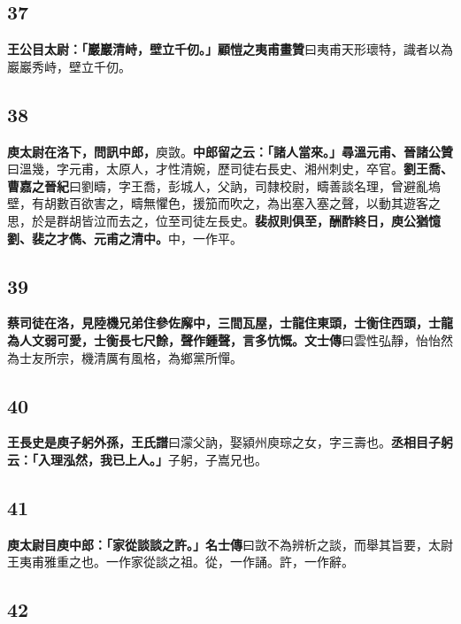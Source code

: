 \subsection*{37}

\textbf{王公目太尉：「巖巖清峙，壁立千仞。」}{\footnotesize \textbf{顧愷之夷甫畫贊}曰夷甫天形瓌特，識者以為巖巖秀峙，壁立千仞。}

\subsection*{38}

\textbf{庾太尉在洛下，問訊中郎，}{\footnotesize 庾敳。}\textbf{中郎留之云：「諸人當來。」尋溫元甫、}{\footnotesize \textbf{晉諸公贊}曰溫幾，字元甫，太原人，才性清婉，歷司徒右長史、湘州刺史，卒官。}\textbf{劉王喬、}{\footnotesize \textbf{曹嘉之晉紀}曰劉疇，字王喬，彭城人，父訥，司隸校尉，疇善談名理，曾避亂塢壁，有胡數百欲害之，疇無懼色，援笳而吹之，為出塞入塞之聲，以動其遊客之思，於是群胡皆泣而去之，位至司徒左長史。}\textbf{裴叔則俱至，酬酢終日，庾公猶憶劉、裴之才儁、元甫之清中。}{\footnotesize 中，一作平。}

\subsection*{39}

\textbf{蔡司徒在洛，見陸機兄弟住參佐廨中，三間瓦屋，士龍住東頭，士衡住西頭，士龍為人文弱可愛，士衡長七尺餘，聲作鍾聲，言多忼慨。}{\footnotesize \textbf{文士傳}曰雲性弘靜，怡怡然為士友所宗，機清厲有風格，為鄉黨所憚。}

\subsection*{40}

\textbf{王長史是庾子躬外孫，}{\footnotesize \textbf{王氏譜}曰濛父訥，娶潁州庾琮之女，字三壽也。}\textbf{丞相目子躬云：「入理泓然，我已上人。」}{\footnotesize 子躬，子嵩兄也。}

\subsection*{41}

\textbf{庾太尉目庾中郎：「家從談談之許。」}{\footnotesize \textbf{名士傳}曰敳不為辨析之談，而舉其旨要，太尉王夷甫雅重之也。一作家從談之祖。從，一作誦。許，一作辭。}

\subsection*{42}

